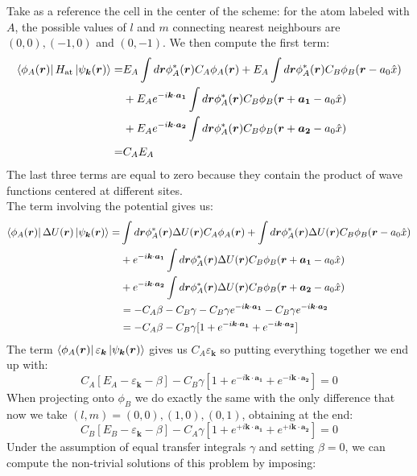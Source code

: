 \documentclass[10.75pt,a4paper,openright,bottom=2cm]{article}
\renewcommand{\Vec}[1]{\boldsymbol{#1}}
\begin{document}
Take as a reference the cell in the center of the scheme: for the atom labeled with $A$, the possible values of $l$ and $m$ connecting nearest neighbours are $(0,0), (-1,0)$ and $(0,-1)$. We then compute the first term:
\begin{align*}
\bra{\phi_A(\Vec{r})}H_{\text{at}}\ket{\psi_{\Vec{k}}(\Vec{r})}=&E_A\int d\Vec{r}\phi_A^*(\Vec{r})C_A\phi_A(\Vec{r})+E_A\int d\Vec{r}\phi_A^*(\Vec{r})C_B\phi_B(\Vec{r}-a_0\hat{x})\\
&+E_Ae^{-i\Vec{k}\cdot\Vec{a_1}}\int d\Vec{r}\phi_A^*(\Vec{r})C_B\phi_B(\Vec{r}+\Vec{a_1}-a_0\hat{x})\\
&+E_Ae^{-i\Vec{k}\cdot\Vec{a_2}}\int d\Vec{r}\phi_A^*(\Vec{r})C_B\phi_B(\Vec{r}+\Vec{a_2}-a_0\hat{x})\\
=&C_AE_A
\end{align*}
The last three terms are equal to zero because they contain the product of wave functions centered at different sites.\\
The term involving the potential gives us:
\begin{align*}
\bra{\phi_A(\Vec{r})}\Delta U(\Vec{r})\ket{\psi_{\Vec{k}}(\Vec{r})}=&\int d\Vec{r}\phi_A^*(\Vec{r})\Delta U(\Vec{r})C_A\phi_A(\Vec{r})+\int d\Vec{r}\phi_A^*(\Vec{r})\Delta U(\Vec{r})C_B\phi_B(\Vec{r}-a_0\hat{x})\\
&+e^{-i\Vec{k}\cdot\Vec{a_1}}\int d\Vec{r}\phi_A^*(\Vec{r})\Delta U(\Vec{r})C_B\phi_B(\Vec{r}+\Vec{a_1}-a_0\hat{x})\\
&+e^{-i\Vec{k}\cdot\Vec{a_2}}\int d\Vec{r}\phi_A^*(\Vec{r})\Delta U(\Vec{r})C_B\phi_B(\Vec{r}+\Vec{a_2}-a_0\hat{x})\\
&=-C_A\beta-C_B\gamma-C_B\gamma e^{-i\Vec{k}\cdot\Vec{a_1}}-C_B\gamma e^{-i\Vec{k}\cdot\Vec{a_2}}\\
&=-C_A\beta-C_B\gamma[1+e^{-i\Vec{k}\cdot\Vec{a_1}}+e^{-i\Vec{k}\cdot\Vec{a_2}}]
\end{align*}
The term $\bra{\phi_A(\Vec{r})}\varepsilon_{\Vec{k}}\ket{\psi_{\Vec{k}}(\Vec{r})}$ gives us $C_A\varepsilon_{\Vec{k}}$ so putting everything together we end up with:
\[
C_A[E_A-\varepsilon_{\Vec{k}}-\beta]-C_B\gamma[1+e^{-i\Vec{k}\cdot\Vec{a_1}}+e^{-i\Vec{k}\cdot\Vec{a_2}}]=0
\]
When projecting onto $\phi_B$ we do exactly the same with the only difference that now we take $(l,m)=(0,0),(1,0),(0,1)$, obtaining at the end:
\[
C_B[E_B-\varepsilon_{\Vec{k}}-\beta]-C_A\gamma[1+e^{+i\Vec{k}\cdot\Vec{a_1}}+e^{+i\Vec{k}\cdot\Vec{a_2}}]=0
\]
Under the assumption of equal transfer integrals $\gamma$ and setting $\beta=0$, we can compute the non-trivial solutions of this problem by imposing:
\end{document}
